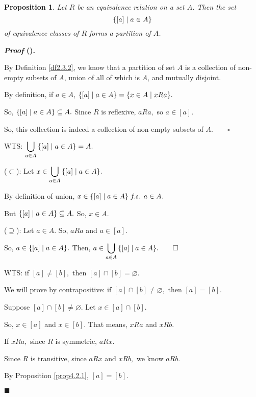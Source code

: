 \documentclass[12pt,a4paper]{article}
\newtheorem{prop}{Proposition}[subsection]
\newcounter{nprf}[subsection]
\newenvironment*{prf}{\par\indent\textbf{\textit{Proof} (\stepcounter{nprf}\thenprf). }\par }{\par\hfill $\blacksquare$\par}
\def\emptyset{\varnothing}
\def\fs{\emph{ f.s. }}
\begin{document}
\begin{framed}
\begin{prop} Let $R$ be an equivalence relation on a set $A$. Then the set \[\qty{[a]\mid a\in A}\] of equivalence classes of $R$ forms a partition of $A$. \end{prop}
\begin{prf}
	By Definition \ref{df2.3.2}, we know that a partition of set $A$ is a collection of non-empty subsets of $A$, union of all of which is $A$, and mutually disjoint.\par
	By definition, if $a\in A$, $\qty{[a]\mid a\in A}=\qty{x\in A\mid xRa}.$\par So, $\qty{[a]\mid a\in A}\subseteq A.$ Since $R$ is reflexive, $aRa,$ so $a\in[a].$\par So, this collection is indeed a collection of non-empty subsets of $A.\qquad\square$\par WTS: $\displaystyle\bigcup_{a\in A}\qty{[a]\mid a\in A}=A.$\par\hspace{5mm} 
	($\subseteq$): Let $x\in\displaystyle\bigcup_{a\in A}\qty{[a]\mid a\in A}.$\par\hspace{10mm} By definition of union, $x\in\qty{[a]\mid a\in A}\fs a\in A.$\par\hspace{10mm} But $\qty{[a]\mid a\in A}\subseteq A.$ So, $x\in A.$\par\hspace{5mm}
	($\supseteq$): Let $a\in A$. So, $aRa$ and $a\in[a].$\par\hspace{10mm} So, $a\in\qty{[a]\mid a\in A}.$ Then, $a\in\displaystyle\bigcup_{a\in A}\qty{[a]\mid a\in A}.\qquad\square$\par
	WTS: if $[a]\neq[b],$ then $[a]\cap[b]=\emptyset.$\par\hspace{5mm} We will prove by contrapositive: if $[a]\cap[b]\neq\emptyset,$ then $[a]=[b].$\par\hspace{5mm} Suppose $[a]\cap[b]\neq\emptyset.$ Let $x\in[a]\cap[b].$\par\hspace{5mm}  So, $x\in[a]$ and $x\in[b].$ That means, $xRa$ and $xRb.$\par\hspace{5mm} If $xRa,$ since $R$ is symmetric, $aRx$.\par\hspace{5mm} Since $R$ is transitive, since $aRx$ and $xRb,$ we know $aRb.$\par\hspace{5mm} By Proposition \ref{prop4.2.1}, $[a]=[b].$
\end{prf}
\end{framed}
\end{document}
